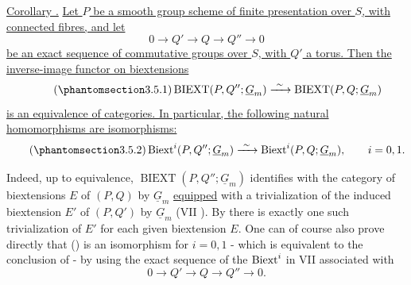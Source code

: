
\medskip
\noindent\underline{Corollary .}  \underline{Let $P$ be a smooth
group scheme of finite presentation over $S$, with connected fibres,
and let}
\[
 0\longrightarrow Q'\longrightarrow Q\longrightarrow Q''
 \longrightarrow0
\]
\underline{be an exact sequence of commutative groups over $S$, with
$Q'$ a torus.  Then the inverse-image functor on biextensions}
\begin{equation}\tag{\SGARefTarget{sga7.sga7i.eviii.n3-5-1}{3.5.1}}
 \operatorname{BIEXT}(P,Q'';\underline G_m)
 \xrightarrow{\ \sim\ }
 \operatorname{BIEXT}(P,Q;\underline G_m)
\end{equation}
\underline{is an equivalence of categories.  In particular, the
following natural homomorphisms are isomorphisms:}
\begin{equation}\tag{\SGARefTarget{sga7.sga7i.eviii.n3-5-2}{3.5.2}}
 \Biext^i(P,Q'';\underline G_m)
 \xrightarrow{\ \sim\ }
 \Biext^i(P,Q;\underline G_m),
 \qquad i=0,1.
\end{equation}

Indeed, up to equivalence, $\operatorname{BIEXT}(P,Q'';\underline
G_m)$ identifies with the category of biextensions $E$ of $(P,Q)$ by
$\underline G_m$ \underline{equipped} with a trivialization of the
induced biextension $E'$ of $(P,Q')$ by $\underline G_m$ (VII
).  By  there is exactly one such trivialization of $E'$ for
each given biextension $E$.  One can of course also prove directly
that () is an isomorphism for $i=0,1$ - which is equivalent to
the conclusion of  - by using the exact sequence of the
$\operatorname{Biext}^i$ in VII  associated with
\[
 0\longrightarrow Q'\longrightarrow Q\longrightarrow Q''
 \longrightarrow0.
\]

